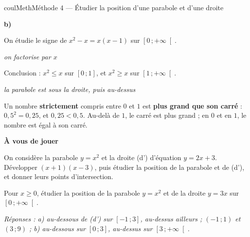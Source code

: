 \documentclass[11pt,a4paper]{article}
\makeatletter
\renewcommand{\le}{\leqslant}
\renewcommand{\ge}{\geqslant}
\newcommand{\lycee@repere}[4]{%
  \draw[grille,step=1] (#1,#2) grid (#3,#4);
  \draw[-{Stealth[length=2mm]},thick] (#1,0)--({#3+0.4},0) node[below left=-1pt]{$x$};
  \draw[-{Stealth[length=2mm]},thick] (0,#2)--(0,{#4+0.4}) node[below left=-1pt]{$y$};
  \node[below left,font=\scriptsize,inner sep=1.5pt] at (0,0) {$0$};}
\newcommand{\lycee@gradx}[1]{\foreach \k/\l in {#1}{%
  \draw (\k,0.07)--(\k,-0.07) node[below,font=\scriptsize,inner sep=1.5pt]{$\l$};}}
\newcommand{\lycee@grady}[1]{\foreach \k/\l in {#1}{%
  \draw (0.07,\k)--(-0.07,\k) node[left,font=\scriptsize,inner sep=1.5pt]{$\l$};}}
\newcommand{\lycee@intff}[2]{\left[#1\,;#2\right]}
\newcommand{\lycee@intfo}[2]{\left[#1\,;#2\right[}
\providecommand{\repere}{\lycee@repere}%
\providecommand{\gradx}{\lycee@gradx}%
\providecommand{\grady}{\lycee@grady}%
\providecommand{\intff}{\lycee@intff}%
\providecommand{\intfo}{\lycee@intfo}%
\newcounter{lycee@signet}
\newcommand{\signet}[3][]{\stepcounter{lycee@signet}%
  \edef\lycee@dest{\if\relax\detokenize{#1}\relax
    signet.\arabic{lycee@signet}\else#1\fi}%
  \hypertarget{\lycee@dest}{}\bookmark[level=#2,dest=\lycee@dest]{#3}}
\newcommand{\res}[1]{#1}
\newcounter{methode}
\newenvironment{methodebox}[1][Méthode]{\stepcounter{methode}%
  \begin{boitecours}[phantom={\signet[methode-\arabic{methode}]{2}{#1}}]{coulMeth}{#1}}%
  {\end{boitecours}}
\newcommand{\etape}[1]{\par\smallskip\textbf{\color{coulMeth}#1}\par\nobreak\smallskip}
\newcommand{\reponse}[1]{\par\smallskip
  {\footnotesize\itshape\color{black!55}Réponses : #1}}
\newcommand{\explique}[2]{\par\smallskip\noindent
  \begin{minipage}[t]{0.57\linewidth}\raggedright #1\end{minipage}\hfill
  \begin{minipage}[t]{0.40\linewidth}\raggedright\leavevmode
    {\small\itshape\color{black!60}#2}\end{minipage}\par}
\newcommand{\cas}[1]{\par\smallskip\noindent\textbf{\color{coulExo}#1}\vadjust{\nobreak}}
\newenvironment{correction}{\par}{\par}
\makeatother
\begin{document}
\begin{methodebox}[Méthode 4 --- Étudier la position d'une parabole et d'une droite]
\begin{correction}
\begin{minipage}[c]{0.58\linewidth}
\end{minipage}\hfill
\begin{minipage}[c]{0.38\linewidth}\centering
{}
\end{minipage}
\cas{b)}
\explique{On étudie le signe de $x^{2}-x=x(x-1)$ sur $\intfo{0}{+\infty}$.}{on factorise par
$x$}
\begin{center}
\end{center}
\explique{Conclusion : \res{$x^{2}\le x$ sur $\intff{0}{1}$}, et \res{$x^{2}\ge x$ sur
$\intfo{1}{+\infty}$}.}{la parabole est sous la droite, puis au-dessus}
\end{correction}

\begin{remarquebox}
Un nombre \textbf{strictement} compris entre $0$ et $1$ est \textbf{plus grand que son
carré} : $0{,}5^{2}=0{,}25$, et $0{,}25<0{,}5$. Au-delà de $1$, le carré est plus grand ; en
$0$ et en $1$, le nombre est égal à son carré.
\end{remarquebox}

\etape{À vous de jouer}
\begin{questions}[label=\alph*)]
  \item On considère la parabole $y=x^{2}$ et la droite (d') d'équation $y=2x+3$.
        Développer $(x+1)(x-3)$, puis étudier la position de la parabole et de (d'), et
        donner leurs points d'intersection.
  \item Pour $x\ge 0$, étudier la position de la parabole $y=x^{2}$ et de la droite
        $y=3x$ sur $\intfo{0}{+\infty}$.
\end{questions}
\reponse{a) au-dessous de (d') sur $\intff{-1}{3}$, au-dessus ailleurs ;
$(-1\,;1)$ et $(3\,;9)$ ;\; b) au-dessous sur $\intff{0}{3}$, au-dessus sur
$\intfo{3}{+\infty}$.}
\end{methodebox}
\end{document}
